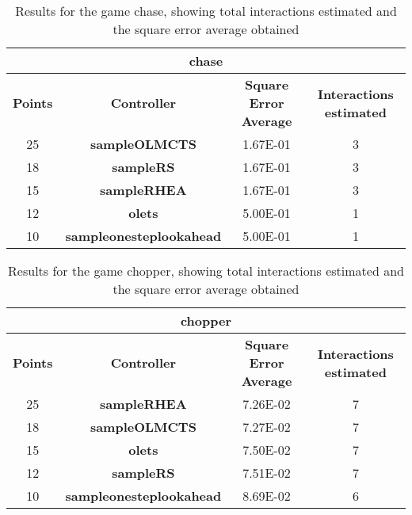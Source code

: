 \begin{table*}[!t]
\begin{center}
\begin{adjustbox}{width=1\textwidth}
\begin{tabular}{|c|c|c|c|}
\hline
\multicolumn{4}{|c|}{\textbf{chase}}\\
\hline
\textbf{Points} & \textbf{Controller} & \textbf{Square Error Average} & \textbf{Interactions estimated}\\
\hline
25 & \textbf{sampleOLMCTS} & 1.67E-01 & 3
 \\
\hline
18 & \textbf{sampleRS} & 1.67E-01 & 3
 \\
\hline
15 & \textbf{sampleRHEA} & 1.67E-01 & 3
 \\
\hline
12 & \textbf{olets} & 5.00E-01 & 1
 \\
\hline
10 & \textbf{sampleonesteplookahead} & 5.00E-01 & 1
 \\
\hline
\end{tabular}
\end{adjustbox}
\caption{Results for the game chase, showing total interactions estimated and the square error average obtained}
\label{tab:weights}
\end{center}
\end{table*}
\begin{table*}[!t]
\begin{center}
\begin{adjustbox}{width=1\textwidth}
\begin{tabular}{|c|c|c|c|}
\hline
\multicolumn{4}{|c|}{\textbf{chopper}}\\
\hline
\textbf{Points} & \textbf{Controller} & \textbf{Square Error Average} & \textbf{Interactions estimated}\\
\hline
25 & \textbf{sampleRHEA} & 7.26E-02 & 7
 \\
\hline
18 & \textbf{sampleOLMCTS} & 7.27E-02 & 7
 \\
\hline
15 & \textbf{olets} & 7.50E-02 & 7
 \\
\hline
12 & \textbf{sampleRS} & 7.51E-02 & 7
 \\
\hline
10 & \textbf{sampleonesteplookahead} & 8.69E-02 & 6
 \\
\hline
\end{tabular}
\end{adjustbox}
\caption{Results for the game chopper, showing total interactions estimated and the square error average obtained}
\label{tab:weights}
\end{center}
\end{table*}
